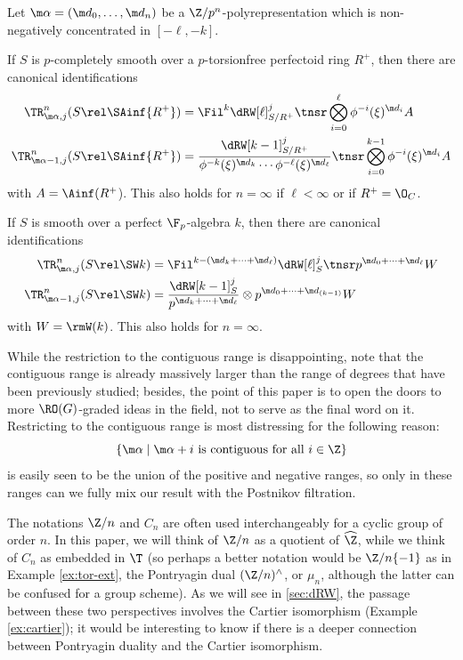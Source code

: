 \begin{theorem}
  \label{thm:intro-tr-ctg}
  Let $\m\alpha = (\m d_0,\dotsc, \m d_n)$ be a $\Z/p^n$-polyrepresentation which is non-negatively concentrated in $[-\ell, -k]$.

  If $S$ is $p$-completely smooth over a $p$-torsionfree perfectoid ring $R^+$, then there are canonical identifications
  \begin{align*}
    \TR^n_{\m\alpha,j}(S\rel\SAinf{R^+})
      &=
        \Fil^k \dRW[\ell]^j_{S/R^+}
        \tnsr
        \bigotimes_{i=0}^\ell \phi^{-i}(\xi)^{\m d_i}A\\
    \TR^n_{\m\alpha-1,j}(S\rel\SAinf{R^+})
      &=
        \frac{\dRW[k-1]^j_{S/R^+}}{\phi^{-k}(\xi)^{\m d_k}\dotsm\phi^{-\ell}(\xi)^{\m d_\ell}}
        \tnsr
        \bigotimes_{i=0}^{k-1} \phi^{-i}(\xi)^{\m d_i}A
  \end{align*}
  with $A=\Ainf(R^+$). This also holds for $n=\infty$ if $\ell<\infty$ or if $R^+=\O_C$.

  If $S$ is smooth over a perfect $\F_p$-algebra $k$, then there are canonical identifications
  \begin{align*}
    \TR^n_{\m\alpha,j}(S\rel\SW k)
      &= \Fil^{k-(\m d_k+\dotsb+\m d_\ell)} \dRW[\ell]^j_S\tnsr p^{\m d_0 + \dotsb + \m d_\ell}W\\
    \TR^n_{\m\alpha-1,j}(S\rel\SW k)
      &= \frac{\dRW[k-1]^j_S}{p^{\m d_k+\dotsb + \m d_\ell}}\otimes p^{\m d_0 + \dotsb + \m d_{(k-1)}}W
  \end{align*}
  with $W=\rmW(k)$. This also holds for $n=\infty$.
\end{theorem}

While the restriction to the contiguous range is disappointing, note that the contiguous range is already massively larger than the range of degrees that have been previously studied; besides, the point of this paper is to open the doors to more $\RO(G)$-graded ideas in the field, not to serve as the final word on it. Restricting to the contiguous range is most distressing for the following reason:
\[ \{\m\alpha \mid \m\alpha + i \text{ is contiguous for all } i \in \Z\} \]
is easily seen to be the union of the positive and negative ranges, so only in these ranges can we fully mix our result with the Postnikov filtration.

\begin{remark}
  The notations $\Z/n$ and $C_n$ are often used interchangeably for a cyclic group of order $n$. In this paper, we will think of $\Z/n$ as a quotient of $\widehat\Z$, while we think of $C_n$ as embedded in $\T$ (so perhaps a better notation would be $\Z/n\{-1\}$ as in Example \ref{ex:tor-ext}, the Pontryagin dual $(\Z/n)^\land$, or $\mu_n$, although the latter can be confused for a group scheme). As we will see in \sec\ref{sec:dRW}, the passage between these two perspectives involves the Cartier isomorphism (Example \ref{ex:cartier}); it would be interesting to know if there is a deeper connection between Pontryagin duality and the Cartier isomorphism.
\end{remark}

